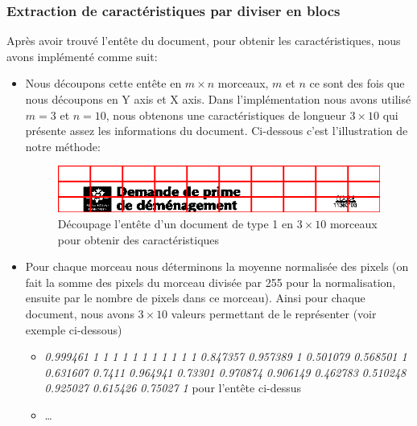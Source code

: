 \documentclass[french,12pt,a4paper,oneside,notitlepage]{report}
\begin{document}
\subsubsection{Extraction de caractéristiques par diviser en blocs}
Après avoir trouvé l'entête du document, pour obtenir les caractéristiques, nous avons implémenté comme suit:
\begin{itemize}
\item Nous découpons cette entête en $m \times n$ morceaux, $m$ et $n$ ce sont des fois que nous découpons en Y axis et X axis. Dans l'implémentation nous avons utilisé $m=3$ et $n =10$, nous obtenons une caractéristiques de longueur $3\times 10$ qui présente assez les informations du document.  Ci-dessous c'est l'illustration de notre méthode:

\begin{figure}[ht]
	\begin{center}
	  \includegraphics[width=14cm]{tete.png}
	\end{center}
	 \caption{Découpage l'entête d'un document de type 1 en $3\times 10$ morceaux
	 pour obtenir des caractéristiques}
\end{figure}


\item Pour chaque morceau nous déterminons la moyenne normalisée des pixels (on fait la
somme des pixels du morceau divisée par 255 pour la normalisation, ensuite par le nombre de pixels dans ce morceau). Ainsi pour chaque document, nous avons
$3\times 10$ valeurs permettant de le représenter (voir exemple ci-dessous)

\begin{itemize}
\item \textit{0.999461 1 1 1 1 1 1 1 1 1 1 1 0.847357 0.957389 1 0.501079 0.568501 1 0.631607 0.7411 0.964941 0.73301 0.970874 0.906149 0.462783 0.510248 0.925027 0.615426 0.75027 1  } pour l'entête ci-dessus

\item \dots
\end{itemize}


\end{itemize}
\end{document}
